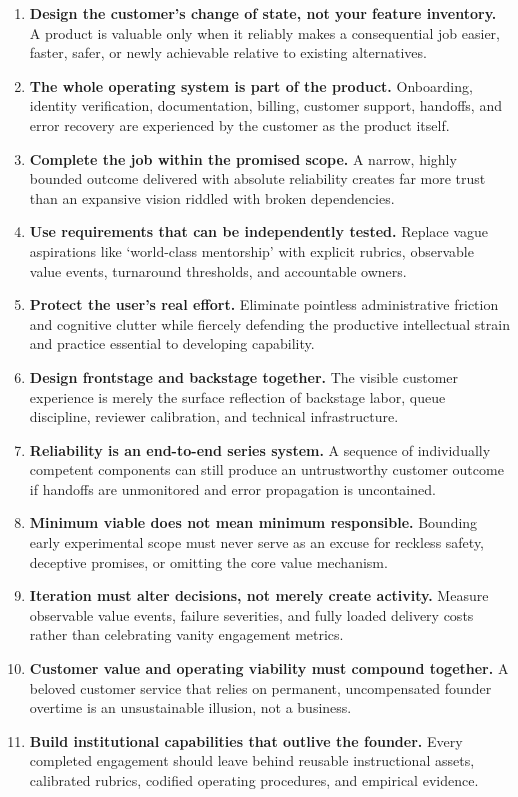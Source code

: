 \begin{enumerate}[leftmargin=*]
\item \textbf{Design the customer's change of state, not your feature inventory.} A product is valuable only when it reliably makes a consequential job easier, faster, safer, or newly achievable relative to existing alternatives.
\item \textbf{The whole operating system is part of the product.} Onboarding, identity verification, documentation, billing, customer support, handoffs, and error recovery are experienced by the customer as the product itself.
\item \textbf{Complete the job within the promised scope.} A narrow, highly bounded outcome delivered with absolute reliability creates far more trust than an expansive vision riddled with broken dependencies.
\item \textbf{Use requirements that can be independently tested.} Replace vague aspirations like `world-class mentorship' with explicit rubrics, observable value events, turnaround thresholds, and accountable owners.
\item \textbf{Protect the user's real effort.} Eliminate pointless administrative friction and cognitive clutter while fiercely defending the productive intellectual strain and practice essential to developing capability.
\item \textbf{Design frontstage and backstage together.} The visible customer experience is merely the surface reflection of backstage labor, queue discipline, reviewer calibration, and technical infrastructure.
\item \textbf{Reliability is an end-to-end series system.} A sequence of individually competent components can still produce an untrustworthy customer outcome if handoffs are unmonitored and error propagation is uncontained.
\item \textbf{Minimum viable does not mean minimum responsible.} Bounding early experimental scope must never serve as an excuse for reckless safety, deceptive promises, or omitting the core value mechanism.
\item \textbf{Iteration must alter decisions, not merely create activity.} Measure observable value events, failure severities, and fully loaded delivery costs rather than celebrating vanity engagement metrics.
\item \textbf{Customer value and operating viability must compound together.} A beloved customer service that relies on permanent, uncompensated founder overtime is an unsustainable illusion, not a business.
\item \textbf{Build institutional capabilities that outlive the founder.} Every completed engagement should leave behind reusable instructional assets, calibrated rubrics, codified operating procedures, and empirical evidence.
\end{enumerate}

